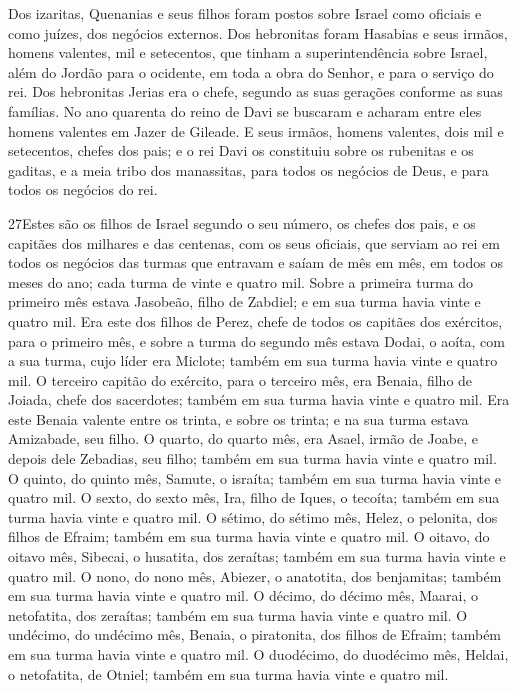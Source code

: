 Dos izaritas, Quenanias e seus filhos foram postos sobre Israel
como oficiais e como juízes, dos negócios externos. Dos
hebronitas foram Hasabias e seus irmãos, homens valentes, mil e
setecentos, que tinham a superintendência sobre Israel, além do
Jordão para o ocidente, em toda a obra do Senhor, e para o serviço
do rei. Dos hebronitas Jerias era o chefe, segundo as suas
gerações conforme as suas famílias. No ano quarenta do reino de Davi
se buscaram e acharam entre eles homens valentes em Jazer de
Gileade. E seus irmãos, homens valentes, dois mil e
setecentos, chefes dos pais; e o rei Davi os constituiu sobre os
rubenitas e os gaditas, e a meia tribo dos manassitas, para todos os
negócios de Deus, e para todos os negócios do rei.

\medskip

\lettrine{27} Estes são os filhos de Israel segundo o seu
número, os chefes dos pais, e os capitães dos milhares e das
centenas, com os seus oficiais, que serviam ao rei em todos os
negócios das turmas que entravam e saíam de mês em mês, em todos os
meses do ano; cada turma de vinte e quatro mil. Sobre a primeira
turma do primeiro mês estava Jasobeão, filho de Zabdiel; e em sua
turma havia vinte e quatro mil. Era este dos filhos de Perez,
chefe de todos os capitães dos exércitos, para o primeiro mês, e
sobre a turma do segundo mês estava Dodai, o aoíta, com a sua turma,
cujo líder era Miclote; também em sua turma havia vinte e quatro
mil. O terceiro capitão do exército, para o terceiro mês, era
Benaia, filho de Joiada, chefe dos sacerdotes; também em sua turma
havia vinte e quatro mil. Era este Benaia valente entre os
trinta, e sobre os trinta; e na sua turma estava Amizabade, seu
filho. O quarto, do quarto mês, era Asael, irmão de Joabe, e
depois dele Zebadias, seu filho; também em sua turma havia vinte e
quatro mil. O quinto, do quinto mês, Samute, o israíta; também
em sua turma havia vinte e quatro mil. O sexto, do sexto mês,
Ira, filho de Iques, o tecoíta; também em sua turma havia vinte e
quatro mil. O sétimo, do sétimo mês, Helez, o pelonita, dos
filhos de Efraim; também em sua turma havia vinte e quatro mil.
O oitavo, do oitavo mês, Sibecai, o husatita, dos zeraítas;
também em sua turma havia vinte e quatro mil. O nono, do nono
mês, Abiezer, o anatotita, dos benjamitas; também em sua turma havia
vinte e quatro mil. O décimo, do décimo mês, Maarai, o
netofatita, dos zeraítas; também em sua turma havia vinte e quatro
mil. O undécimo, do undécimo mês, Benaia, o piratonita, dos
filhos de Efraim; também em sua turma havia vinte e quatro mil.
O duodécimo, do duodécimo mês, Heldai, o netofatita, de
Otniel; também em sua turma havia vinte e quatro mil.

